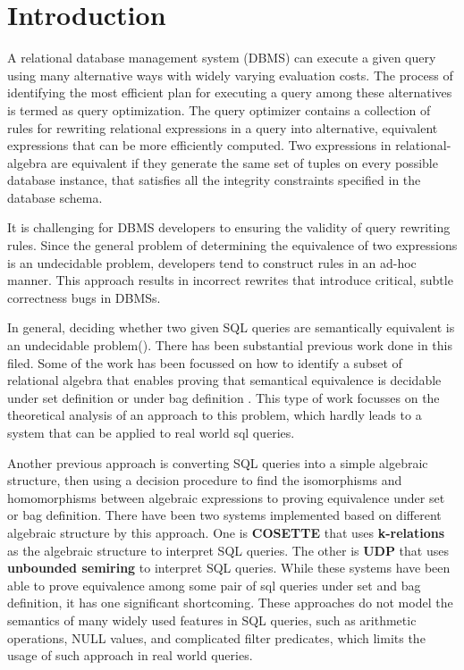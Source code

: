 \section{Introduction}\label{sec:introduction}

A relational database management system (DBMS) can execute a given query using
many alternative ways with widely varying evaluation costs. 
The process of identifying the most efficient plan for executing a query among
these alternatives is termed as query optimization. 
The query optimizer contains a collection of rules for rewriting relational
expressions in a query into alternative, equivalent expressions that can be more
efficiently computed. Two expressions in relational-algebra are equivalent 
if they generate the same set of tuples on every possible database instance,
that satisfies all the integrity constraints specified in the database schema.
 
It is challenging for DBMS developers to ensuring the validity of query
rewriting rules. Since the general problem of determining the equivalence of two
expressions is an undecidable problem, developers tend to construct rules
in an ad-hoc manner. This approach results in incorrect rewrites that introduce
critical, subtle correctness bugs in DBMSs.

In general, deciding whether two given SQL queries are semantically equivalent
is an undecidable problem().
There has been substantial previous work done in this filed.
Some of the work has been focussed on how to identify a subset of relational
algebra that enables proving that semantical equivalence is decidable under set
definition  or under bag definition .
This type of work focusses on the theoretical analysis of an approach to this
problem, which hardly leads to a system that can be applied to real world sql
queries.

Another previous approach is converting SQL queries into a simple algebraic
structure, then using a decision procedure to find the isomorphisms and
homomorphisms between algebraic expressions to proving equivalence under set or
bag definition.
There have been two systems implemented based on different algebraic structure
by this approach.
One is \textbf{COSETTE}  that uses \textbf{k-relations} as the
algebraic structure to interpret SQL queries.
The other is \textbf{UDP}  that uses \textbf{unbounded semiring} to
interpret SQL queries.
While these systems have been able to prove equivalence among some pair of sql
queries under set and bag definition, it has one significant shortcoming.
These approaches do not model the semantics of many widely used features in SQL
queries, such as arithmetic operations, NULL values, and complicated filter predicates,
which limits the usage of such approach in real world queries.

